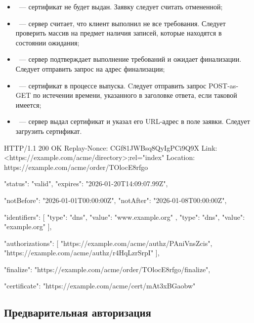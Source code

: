 \begin{itemize}
\item
{}~--- сертификат не будет выдан. Заявку следует считать 
отмененной;

\item
{}~--- сервер считает, что клиент выполнил не все требования. 
Следует проверить массив  на предмет наличия записей,  
которые находятся в состоянии ожидания;

\item
{}~--- сервер подтверждает выполнение требований и ожидает 
финализации. Следует отправить запрос на адрес финализации;
 
\item
{}~--- сертификат в процессе выпуска. Cледует отправить запрос 
POST-as-GET по истечении времени, указанного в заголовке 
ответа, если таковой имеется;

\item
{}~--- сервер выдал сертификат и указал его URL-адрес в поле
 заявки. Следует загрузить сертификат.
\end{itemize}

\begin{codeblock}
HTTP/1.1 200 OK
Replay-Nonce: CGf81JWBsq8QyIgPCi9Q9X
Link: <https://example.com/acme/directory>;rel="index"
Location: https://example.com/acme/order/TOlocE8rfgo

{
  "status": "valid",
  "expires": "2026-01-20T14:09:07.99Z",

  "notBefore": "2026-01-01T00:00:00Z",
  "notAfter": "2026-01-08T00:00:00Z",

  "identifiers": [
    { "type": "dns", "value": "www.example.org" },
    { "type": "dns", "value": "example.org" }
  ],

  "authorizations": [
    "https://example.com/acme/authz/PAniVnsZcis",
    "https://example.com/acme/authz/r4HqLzrSrpI"
  ],

  "finalize": "https://example.com/acme/order/TOlocE8rfgo/finalize",

  "certificate": "https://example.com/acme/cert/mAt3xBGaobw"
}
\end{codeblock}
\fi

\subsection{Предварительная авторизация}\label{ACME.Order.Preauthz}


